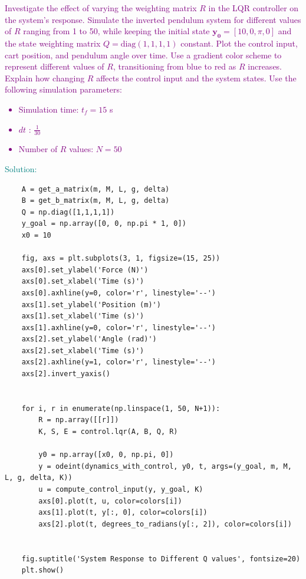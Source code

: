 \documentclass[a4 paper]{article}
\begin{document}
\newpage
\textcolor{purple}{
 Investigate the effect of varying the weighting matrix \( R \) in the LQR controller on the system's response. 
Simulate the inverted pendulum system for different values of \( R \) ranging from 1 to 50, 
while keeping the initial state \(\mathbf{y_0} = [10, 0, \pi, 0]\) and the state weighting matrix \( Q = \text{diag}(1,1,1,1) \) constant. 
Plot the control input, cart position, and pendulum angle over time. Use a gradient color scheme to represent different values of \( R \), 
transitioning from blue to red as \( R \) increases. Explain how changing \( R \) affects the control input and the system states.
Use the following simulation parameters:
\begin{itemize}
    \item Simulation time: \( t_f = 15 \) s
    \item $dt$ : \( \frac{1}{30} \)
    \item Number of \( R \) values: \( N = 50 \)
\end{itemize}
}


\medbreak

\textcolor{teal}{
    Solution:
}

\begin{verbatim}
    A = get_a_matrix(m, M, L, g, delta)
    B = get_b_matrix(m, M, L, g, delta)
    Q = np.diag([1,1,1,1])
    y_goal = np.array([0, 0, np.pi * 1, 0])
    x0 = 10

    fig, axs = plt.subplots(3, 1, figsize=(15, 25))
    axs[0].set_ylabel('Force (N)')
    axs[0].set_xlabel('Time (s)')
    axs[0].axhline(y=0, color='r', linestyle='--')
    axs[1].set_ylabel('Position (m)')
    axs[1].set_xlabel('Time (s)')
    axs[1].axhline(y=0, color='r', linestyle='--')
    axs[2].set_ylabel('Angle (rad)')
    axs[2].set_xlabel('Time (s)')
    axs[2].axhline(y=1, color='r', linestyle='--')
    axs[2].invert_yaxis()


    for i, r in enumerate(np.linspace(1, 50, N+1)):
        R = np.array([[r]])
        K, S, E = control.lqr(A, B, Q, R)

        y0 = np.array([x0, 0, np.pi, 0])
        y = odeint(dynamics_with_control, y0, t, args=(y_goal, m, M, L, g, delta, K))
        u = compute_control_input(y, y_goal, K)
        axs[0].plot(t, u, color=colors[i])
        axs[1].plot(t, y[:, 0], color=colors[i])
        axs[2].plot(t, degrees_to_radians(y[:, 2]), color=colors[i])


    fig.suptitle('System Response to Different Q values', fontsize=20)
    plt.show()
\end{verbatim}
\end{document}
